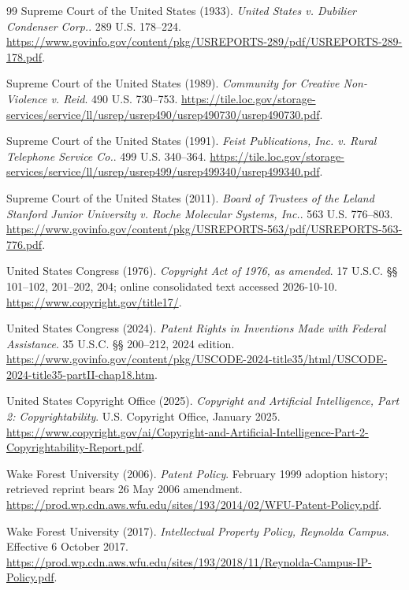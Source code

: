 \begin{thebibliography}{99}
 Supreme Court of the United States (1933). \emph{United States v. Dubilier Condenser Corp.}. 289 U.S. 178–224. \url{https://www.govinfo.gov/content/pkg/USREPORTS-289/pdf/USREPORTS-289-178.pdf}.

 Supreme Court of the United States (1989). \emph{Community for Creative Non-Violence v. Reid}. 490 U.S. 730–753. \url{https://tile.loc.gov/storage-services/service/ll/usrep/usrep490/usrep490730/usrep490730.pdf}.

 Supreme Court of the United States (1991). \emph{Feist Publications, Inc. v. Rural Telephone Service Co.}. 499 U.S. 340–364. \url{https://tile.loc.gov/storage-services/service/ll/usrep/usrep499/usrep499340/usrep499340.pdf}.

 Supreme Court of the United States (2011). \emph{Board of Trustees of the Leland Stanford Junior University v. Roche Molecular Systems, Inc.}. 563 U.S. 776–803. \url{https://www.govinfo.gov/content/pkg/USREPORTS-563/pdf/USREPORTS-563-776.pdf}.

 United States Congress (1976). \emph{Copyright Act of 1976, as amended}. 17 U.S.C. §§ 101–102, 201–202, 204; online consolidated text accessed 2026-10-10. \url{https://www.copyright.gov/title17/}.

 United States Congress (2024). \emph{Patent Rights in Inventions Made with Federal Assistance}. 35 U.S.C. §§ 200–212, 2024 edition. \url{https://www.govinfo.gov/content/pkg/USCODE-2024-title35/html/USCODE-2024-title35-partII-chap18.htm}.

 United States Copyright Office (2025). \emph{Copyright and Artificial Intelligence, Part 2: Copyrightability}. U.S. Copyright Office, January 2025. \url{https://www.copyright.gov/ai/Copyright-and-Artificial-Intelligence-Part-2-Copyrightability-Report.pdf}.

 Wake Forest University (2006). \emph{Patent Policy}. February 1999 adoption history; retrieved reprint bears 26 May 2006 amendment. \url{https://prod.wp.cdn.aws.wfu.edu/sites/193/2014/02/WFU-Patent-Policy.pdf}.

 Wake Forest University (2017). \emph{Intellectual Property Policy, Reynolda Campus}. Effective 6 October 2017. \url{https://prod.wp.cdn.aws.wfu.edu/sites/193/2018/11/Reynolda-Campus-IP-Policy.pdf}.


\end{thebibliography}
